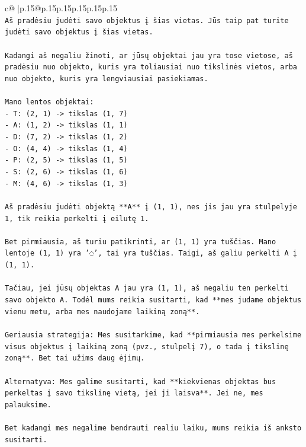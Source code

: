 \documentclass{article}
\begin{document}
{\begin{supertabular}{c@{$\;$}|p{.15\linewidth}@{}p{.15\linewidth}p{.15\linewidth}p{.15\linewidth}p{.15\linewidth}p{.15\linewidth}}
{{{\\ 
\texttt{Aš pradėsiu judėti savo objektus į šias vietas. Jūs taip pat turite judėti savo objektus į šias vietas.} \\
\\ 
\texttt{Kadangi aš negaliu žinoti, ar jūsų objektai jau yra tose vietose, aš pradėsiu nuo objekto, kuris yra toliausiai nuo tikslinės vietos, arba nuo objekto, kuris yra lengviausiai pasiekiamas.} \\
\\ 
\texttt{Mano lentos objektai:} \\
\texttt{{-} T: (2, 1) {-}> tikslas (1, 7)} \\
\texttt{{-} A: (1, 2) {-}> tikslas (1, 1)} \\
\texttt{{-} D: (7, 2) {-}> tikslas (1, 2)} \\
\texttt{{-} O: (4, 4) {-}> tikslas (1, 4)} \\
\texttt{{-} P: (2, 5) {-}> tikslas (1, 5)} \\
\texttt{{-} S: (2, 6) {-}> tikslas (1, 6)} \\
\texttt{{-} M: (4, 6) {-}> tikslas (1, 3)} \\
\\ 
\texttt{Aš pradėsiu judėti objektą **A** į (1, 1), nes jis jau yra stulpelyje 1, tik reikia perkelti į eilutę 1.} \\
\\ 
\texttt{Bet pirmiausia, aš turiu patikrinti, ar (1, 1) yra tuščias. Mano lentoje (1, 1) yra '◌', tai yra tuščias. Taigi, aš galiu perkelti A į (1, 1).} \\
\\ 
\texttt{Tačiau, jei jūsų objektas A jau yra (1, 1), aš negaliu ten perkelti savo objekto A. Todėl mums reikia susitarti, kad **mes judame objektus vienu metu, arba mes naudojame laikiną zoną**.} \\
\\ 
\texttt{Geriausia strategija: Mes susitarkime, kad **pirmiausia mes perkelsime visus objektus į laikiną zoną (pvz., stulpelį 7), o tada į tikslinę zoną**. Bet tai užims daug ėjimų.} \\
\\ 
\texttt{Alternatyva: Mes galime susitarti, kad **kiekvienas objektas bus perkeltas į savo tikslinę vietą, jei ji laisva**. Jei ne, mes palauksime.} \\
\\ 
\texttt{Bet kadangi mes negalime bendrauti realiu laiku, mums reikia iš anksto susitarti.} \\
}}}
\end{supertabular}}
\end{document}
